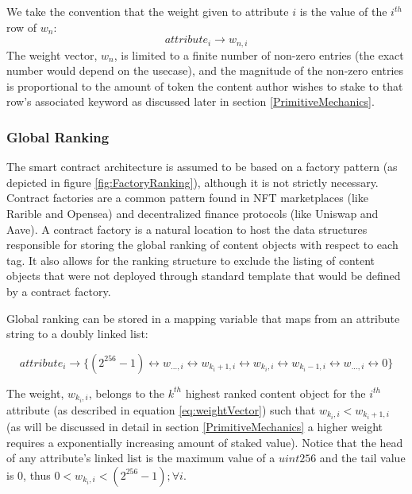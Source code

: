 We take the convention that the weight given to  attribute $i$ is the value of the $i^{th}$ row of $w_n$: 
\begin{equation}
    \label{eq:weightVector}
    attribute_i \rightarrow w_{n,i}
\end{equation}
 The weight vector, $w_n$, is limited to a finite number of non-zero entries (the exact number would depend on the usecase), and the magnitude of the non-zero entries is proportional to the amount of token the content author wishes to stake to that row’s associated keyword as discussed later in section \ref{PrimitiveMechanics}. 

\subsubsection{Global Ranking}
\label{GlobalRankingDefinition}


The smart contract architecture is assumed to be based on a factory pattern (as depicted in figure \ref{fig:FactoryRanking}), although it is not strictly necessary. Contract factories are a common pattern found in NFT marketplaces (like Rarible and Opensea) and decentralized finance protocols (like Uniswap and Aave). A contract factory is a natural location to host the data structures responsible for storing the global ranking of content objects with respect to each tag. It also allows for the ranking structure to exclude the listing of content objects that were not deployed through standard template that would be defined by a contract factory. 

Global ranking can be stored in a mapping variable that maps from an attribute string to a doubly linked list:

\begin{equation}
    attribute_i \rightarrow \{(2^{256}-1) \leftrightarrow w_{...,i} \leftrightarrow w_{k_i+1,i} \leftrightarrow w_{k_i,i} \leftrightarrow w_{k_i-1,i} \leftrightarrow w_{...,i} \leftrightarrow 0\}
\end{equation}

The weight, $w_{k_i,i}$, belongs to the $k^{th}$ highest ranked content object for the $i^{th}$ attribute (as described in equation \ref{eq:weightVector}) such that $w_{k_i,i} < w_{k_i+1,i}$ (as will be discussed in detail in section \ref{PrimitiveMechanics} a higher weight requires a exponentially increasing amount of staked value). Notice that the head of any attribute's linked list is the maximum value of a $uint256$ and the tail value is $0$, thus $0 < w_{k_i,i} < (2^{256}-1); \forall i$. 

